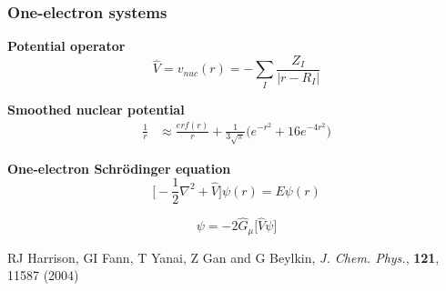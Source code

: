 \documentclass[mathserif, 10pt]{beamer}
\begin{document}
\begin{frame}
    \frametitle{One-electron systems}
    \centering
    \textbf{Potential operator}
    \begin{equation}
	\nonumber
	\hat{V} = v_{nuc}(r) = -\sum_I\frac{Z_I}{|r-R_I|}
    \end{equation}

    \vspace{5mm}

    \textbf{Smoothed nuclear potential}
    \begin{align}
	\nonumber
	\frac{1}{r} &\approx \frac{erf(r)}{r} +
	\frac{1}{3\sqrt{\pi}}\big(e^{-r^2}+16e^{-4r^2}\big)
    \end{align}

    \vspace{5mm}

    \textbf{One-electron Schr\"{o}dinger equation}
    \begin{equation}
        \nonumber
        \Big[-\frac{1}{2}\nabla^2 + \hat{V}\Big]\psi(r) = E \psi(r)
    \end{equation}

    \vspace{1mm}

    \begin{equation}
        \nonumber
        \psi = -2\hat{G}_\mu \Big[\hat{V} \psi \Big]
    \end{equation}

    \vspace{5mm}

    \centering
    \tiny
    RJ Harrison, GI Fann, T Yanai, Z Gan and G Beylkin,
    {\it J. Chem. Phys.}, 
    \textbf{121},
    11587 (2004)
\end{frame}
\end{document}
